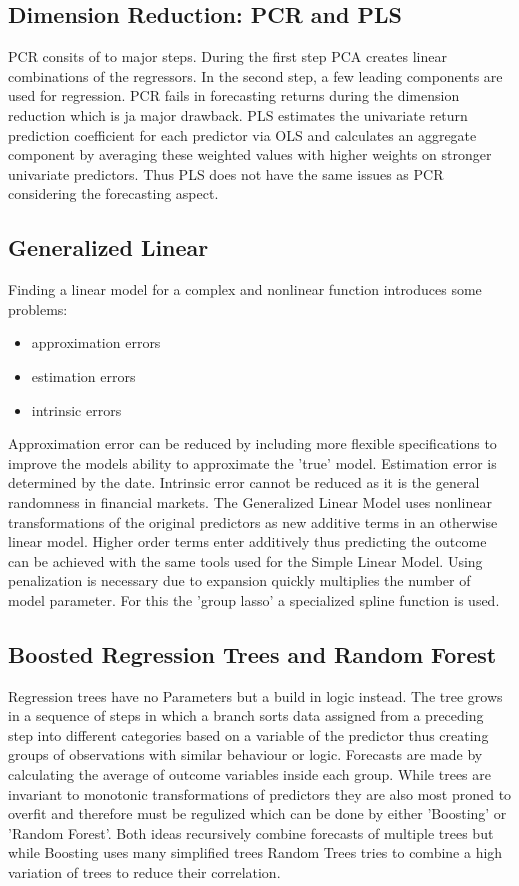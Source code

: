 \documentclass{article}
\begin{document}
\subsection{Dimension Reduction: PCR and PLS}
	PCR consits of to major steps. During the first step PCA creates linear combinations
	of the regressors. In the second step, a few leading components are used for regression.
	PCR fails in forecasting returns during the dimension reduction which is ja major drawback.
	\newline
	PLS estimates the univariate return prediction coefficient for each predictor via OLS
	and calculates an aggregate component by averaging these weighted values
	with higher weights on stronger univariate predictors. Thus PLS does not have the
	same issues as PCR considering the forecasting aspect.

\subsection{Generalized Linear}
	Finding a linear model for a complex and nonlinear function introduces some problems:
	\begin{itemize}
		\item approximation errors
		\item estimation errors
		\item intrinsic errors
	\end{itemize}
	Approximation error can be reduced by including more flexible specifications to improve the
	models ability to approximate the 'true' model.
	Estimation error is determined by the date.
	Intrinsic error cannot be reduced as it is the general randomness in financial markets.
	The Generalized Linear Model uses nonlinear transformations of the original predictors as new
	additive terms in an otherwise linear model.
	Higher order terms enter additively thus predicting the outcome can be achieved with the same
	tools used for the Simple Linear Model.
	Using penalization is necessary due to expansion quickly multiplies the number of model parameter.
	For this the 'group lasso' a specialized spline function is used.

\subsection{Boosted Regression Trees and Random Forest}
	Regression trees have no Parameters but a build in logic instead.
	The tree grows in a sequence of steps in which a branch sorts data assigned from
	a preceding step into different categories based on a variable of the predictor
	thus creating groups of observations with similar behaviour or logic.
	Forecasts are made by calculating the average of outcome variables inside each group.
	While trees are invariant to monotonic transformations of predictors they are
	also most proned to overfit and therefore must be regulized which can be done
	by either 'Boosting' or 'Random Forest'. Both ideas recursively combine
	forecasts of multiple trees but while Boosting uses many simplified trees
	Random Trees tries to combine a high variation of trees to reduce their correlation.
\end{document}
